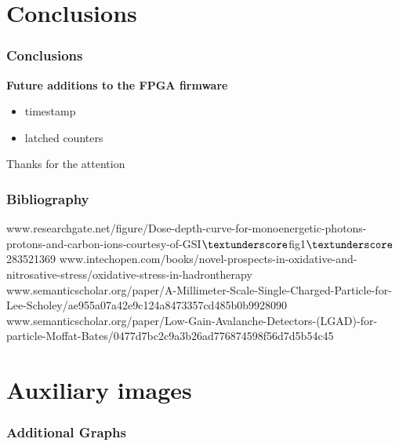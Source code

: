 \documentclass[aspectratio=169]{beamer}
\begin{document}
	\section{Conclusions}
	
	\begin{frame}
	\frametitle{Conclusions }
	\begin{center}
		\textbf{Future additions to the FPGA firmware}
	\end{center}
		\begin{itemize}
			\item timestamp
			\item latched counters
			
		\end{itemize}
		\begin{center}
			Thanks for the attention
		\end{center}
		
	\end{frame}

	\begin{frame}
	\frametitle{Bibliography}
	{\scriptsize 
	\begin{thebibliography}{00}
		www.researchgate.net/figure/Dose-depth-curve-for-monoenergetic-photons-protons-and-carbon-ions-courtesy-of-GSI$\textunderscore$fig1$\textunderscore$283521369
		\newline
		www.intechopen.com/books/novel-prospects-in-oxidative-and-nitrosative-stress/oxidative-stress-in-hadrontherapy
		\newline
		www.semanticscholar.org/paper/A-Millimeter-Scale-Single-Charged-Particle-for-Lee-Scholey/ae955a07a42e9c124a8473357cd485b0b9928090
		\newline
		www.semanticscholar.org/paper/Low-Gain-Avalanche-Detectors-(LGAD)-for-particle-Moffat-Bates/0477d7bc2c9a3b26ad776874598f56d7d5b54c45
	\end{thebibliography} }
	\end{frame}

	\section{Auxiliary images}
	
	\begin{frame}
	\frametitle{Additional Graphs}
	
	\end{frame}
\end{document}
